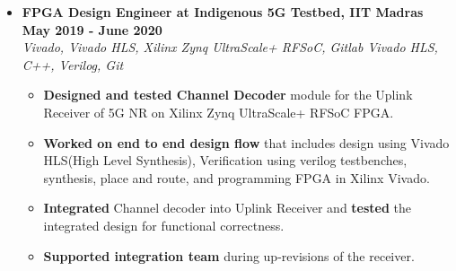 \documentclass[a4paper,11pt]{article}
\newcommand{\isep}{-2 pt}
\newcommand{\spsep}{-0.75cm}
\begin{document}
\begin{itemize}
	\item \textbf{FPGA Design Engineer at Indigenous 5G Testbed, IIT Madras \hfill May 2019 - June 2020} \\
	\emph{Vivado, Vivado HLS, Xilinx Zynq UltraScale+ RFSoC, Gitlab \hfill Vivado HLS, C++, Verilog, Git} \\[\spsep]
	\begin{itemize} \itemsep \isep
		\item \textbf{Designed and tested Channel Decoder} module for the Uplink Receiver of 5G NR on Xilinx Zynq UltraScale+ RFSoC FPGA.
		\item \textbf{Worked on end to end design flow} that includes design using Vivado HLS(High Level Synthesis), Verification using verilog testbenches, synthesis, place and route, and programming FPGA in Xilinx Vivado. 
		\item \textbf{Integrated} Channel decoder into Uplink Receiver and \textbf{tested} the integrated design for functional correctness.
		\item \textbf{Supported integration team} during up-revisions of the receiver.
	\end{itemize}

\iffalse


\end{itemize}
\end{document}
